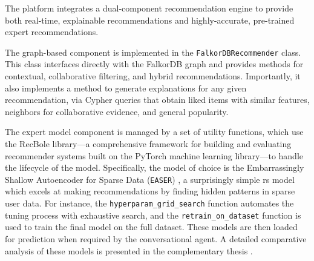The platform integrates a dual-component recommendation engine to provide both real-time, explainable recommendations and highly-accurate, pre-trained expert recommendations.

The graph-based component is implemented in the \texttt{FalkorDBRecommender} class. This class interfaces directly with the FalkorDB graph and provides methods for contextual, collaborative filtering, and hybrid recommendations. Importantly, it also implements a method to generate explanations for any given recommendation, via Cypher queries that obtain liked items with similar features, neighbors for collaborative evidence, and general popularity.

The expert model component is managed by a set of utility functions, which use the RecBole \cite{RECBOLE} library---a comprehensive framework for building and evaluating recommender systems built on the PyTorch \cite{PYTORCH} machine learning library---to handle the lifecycle of the model. Specifically, the model of choice is the Embarrassingly Shallow Autoencoder for Sparse Data (\texttt{EASER}) \cite{EASER}, a surprisingly simple \acs{rs} model which excels at making recommendations by finding hidden patterns in sparse user data. For instance, the \texttt{hyperparam\_grid\_search} function automates the tuning process with exhaustive search, and the \texttt{retrain\_on\_dataset} function is used to train the final model on the full dataset. These models are then loaded for prediction when required by the conversational agent. A detailed comparative analysis of these models is presented in the complementary thesis \cite{MUI2ICSI_THESIS}.